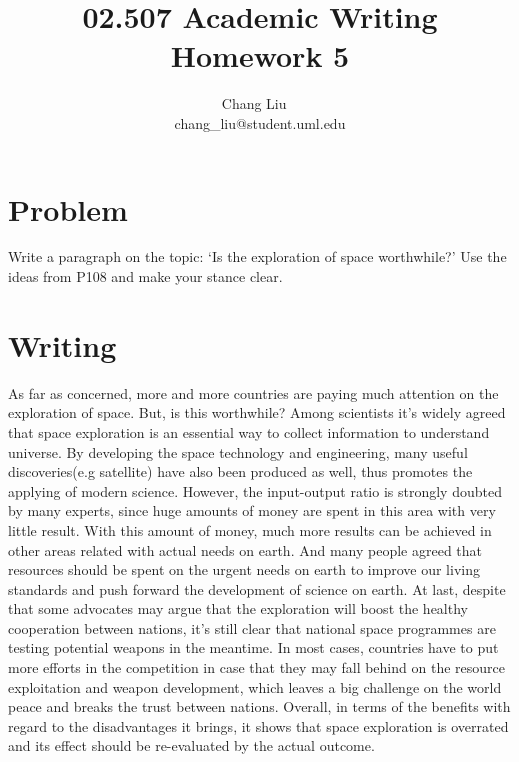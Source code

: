 \documentclass{article}
\title{02.507 Academic Writing Homework 5}
\author{Chang Liu ~\\ chang\_liu@student.uml.edu}
\begin{document}
\maketitle

\section{Problem}

Write a paragraph on the topic: `Is the exploration of space worthwhile?' Use the ideas from P108 and make your stance clear.

\section{Writing}

\large{

As far as concerned, more and more countries are paying much attention on the exploration of space. But, is this worthwhile? Among scientists it's widely agreed that space exploration is an essential way to collect information to understand universe. By developing the space technology and engineering, many useful discoveries(e.g satellite) have also been produced as well, thus promotes the applying of modern science. However, the input-output ratio is strongly doubted by many experts, since huge amounts of money are spent in this area with very little result. With this amount of money, much more results can be achieved in other areas related with actual needs on earth. And many people agreed that resources should be spent on the urgent needs on earth to improve our living standards and push forward the development of science on earth. At last, despite that some advocates may argue that the exploration will boost the healthy cooperation between nations, it's still clear that national space programmes are testing potential weapons in the meantime. In most cases, countries have to put more efforts in the competition in case that they may fall behind on the resource exploitation and weapon development, which leaves a big challenge on the world peace and breaks the trust between nations. Overall, in terms of the benefits with regard to the disadvantages it brings, it shows that space exploration is overrated and its effect should be re-evaluated by the actual outcome. 

}
\end{document}
